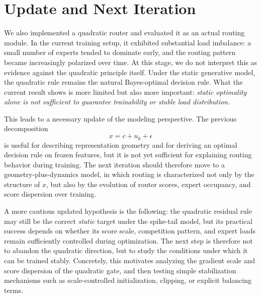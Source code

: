 \documentclass[11pt]{article}
\begin{document}
\section{Update and Next Iteration}

We also implemented a quadratic router and evaluated it as an actual routing module. In the current training setup, it exhibited substantial load imbalance: a small number of experts tended to dominate early, and the routing pattern became increasingly polarized over time. At this stage, we do not interpret this as evidence against the quadratic principle itself. Under the static generative model, the quadratic rule remains the natural Bayes-optimal decision rule. What the current result shows is more limited but also more important: \emph{static optimality alone is not sufficient to guarantee trainability or stable load distribution.}

This leads to a necessary update of the modeling perspective. The previous decomposition
\[
x = c + u_k + \epsilon
\]
is useful for describing representation geometry and for deriving an optimal decision rule on frozen features, but it is not yet sufficient for explaining routing behavior during training. The next iteration should therefore move to a geometry-plus-dynamics model, in which routing is characterized not only by the structure of \(x\), but also by the evolution of router scores, expert occupancy, and score dispersion over training.

A more cautious updated hypothesis is the following: the quadratic residual rule may still be the correct \emph{static} target under the spike-tail model, but its practical success depends on whether its score scale, competition pattern, and expert loads remain sufficiently controlled during optimization. The next step is therefore not to abandon the quadratic direction, but to study the conditions under which it can be trained stably. Concretely, this motivates analyzing the gradient scale and score dispersion of the quadratic gate, and then testing simple stabilization mechanisms such as scale-controlled initialization, clipping, or explicit balancing terms.
\end{document}
